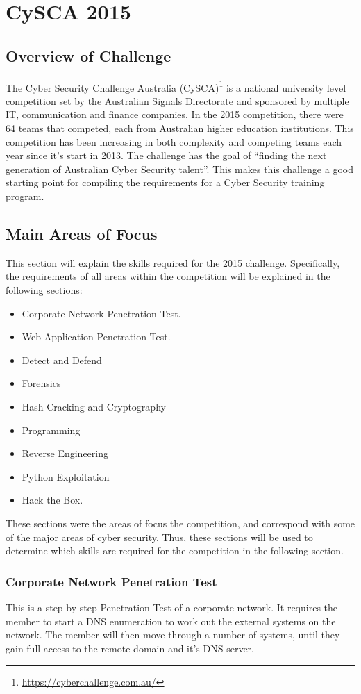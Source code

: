 \documentclass[a4paper,11pt]{report}
\begin{document}
\chapter{CySCA 2015}
	\section{Overview of Challenge}
		The Cyber Security Challenge Australia (CySCA)\footnote{\url{https://cyberchallenge.com.au/}} is a national university level competition set by the Australian Signals Directorate 
		and sponsored by multiple IT, communication and finance companies. 
		In the 2015 competition, there were 64 teams that competed, each from Australian higher education institutions. 
		This competition has been increasing in both complexity and competing teams each year since it's start in 2013. 
		The challenge has the goal of ``finding the next generation of Australian Cyber Security talent''.
		This makes this challenge a good starting point for compiling the requirements for a Cyber Security training program. 
	\section{Main Areas of Focus}
		This section will explain the skills required for the 2015 challenge. 
		Specifically, the requirements of all areas within the competition will be explained in the following sections:
		\begin{itemize}
			\item Corporate Network Penetration Test.
			\item Web Application Penetration Test. 
			\item Detect and Defend
			\item Forensics
			\item Hash Cracking and Cryptography
			\item Programming
			\item Reverse Engineering
			\item Python Exploitation
			\item Hack the Box. 
		\end{itemize}
		These sections were the areas of focus the competition, and correspond with some of the major areas of cyber security.
		Thus, these sections will be used to determine which skills are required for the competition in the following section. 
		\subsection{Corporate Network Penetration Test}
			This is a step by step Penetration Test of a corporate network. 
			It requires the member to start a DNS enumeration to work out the external systems on the network. 
			The member will then move through a number of systems, 
			until they gain full access to the remote domain and it's DNS server. 
\end{document}
